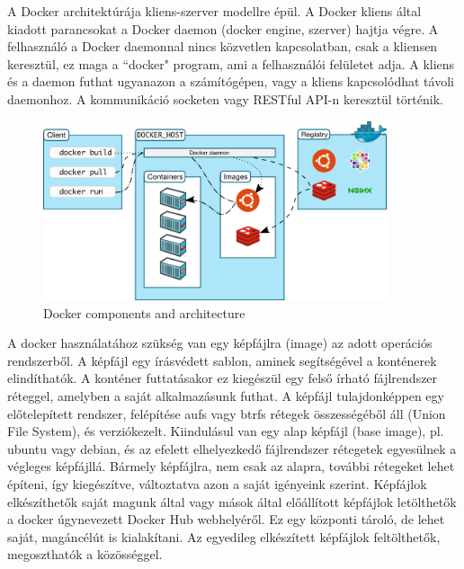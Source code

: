 \documentclass[a4paper]{article}
\begin{document}
A Docker architektúrája kliens-szerver modellre épül. A Docker kliens által kiadott parancsokat a Docker daemon (docker engine, szerver) hajtja végre. A felhasználó a Docker daemonnal nincs közvetlen kapcsolatban, csak a kliensen keresztül, ez maga a ``docker" program, ami a felhasználói felületet adja. A kliens és a daemon futhat ugyanazon a számítógépen, vagy a kliens kapcsolódhat távoli daemonhoz. A kommunikáció socketen vagy RESTful API-n keresztül történik.

\begin{figure}[H]
    \centering
    \includegraphics[width=0.9\textwidth]{figures/docker_arch.png}
    \caption{Docker components and architecture}
    \label{fig:arch}
\end{figure}

A docker használatához szükség van egy képfájlra (image) az adott operációs rendszerből. A képfájl egy írásvédett sablon, aminek segítségével a konténerek elindíthatók. A konténer futtatásakor ez kiegészül egy felső írható fájlrendszer réteggel, amelyben a saját alkalmazásunk futhat. A képfájl tulajdonképpen egy előtelepített rendszer, felépítése aufs vagy btrfs rétegek összességéből áll (Union File System), és verziókezelt. Kiindulásul van egy alap képfájl (base image), pl. ubuntu vagy debian, és az efelett elhelyezkedő fájlrendszer rétegetek egyesülnek a végleges képfájllá. Bármely képfájlra, nem csak az alapra, további rétegeket lehet építeni, így kiegészítve, változtatva azon a saját igényeink szerint. Képfájlok elkészíthetők saját magunk által vagy mások által előállított képfájlok letölthetők a docker úgynevezett Docker Hub webhelyéről. Ez egy központi tároló, de lehet saját, magáncélút is kialakítani. Az egyedileg elkészített képfájlok feltölthetők, megoszthatók a közösséggel.
\end{document}

